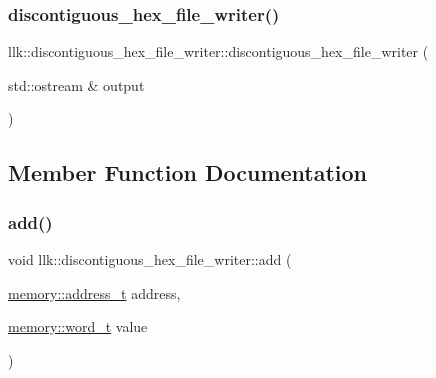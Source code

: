 \subsubsection{\texorpdfstring{discontiguous\+\_\+hex\+\_\+file\+\_\+writer()}{discontiguous\_hex\_file\_writer()}}
{\footnotesize\ttfamily llk\+::discontiguous\+\_\+hex\+\_\+file\+\_\+writer\+::discontiguous\+\_\+hex\+\_\+file\+\_\+writer (\begin{DoxyParamCaption}\item[{std\+::ostream \&}]{output }\end{DoxyParamCaption})\hspace{0.3cm}{\ttfamily [explicit]}}



\subsection{Member Function Documentation}
\mbox{\label{classllk_1_1discontiguous__hex__file__writer_a4dc35f2a9382c453d050d3e0ef8e1898}} 
\subsubsection{\texorpdfstring{add()}{add()}\hspace{0.1cm}{\footnotesize\ttfamily [1/2]}}
{\footnotesize\ttfamily void llk\+::discontiguous\+\_\+hex\+\_\+file\+\_\+writer\+::add (\begin{DoxyParamCaption}\item[{\hyperlink{classllk_1_1memory_ae7a4b897aa999f22e250dc8e4d773dec}{memory\+::address\+\_\+t}}]{address,  }\item[{\hyperlink{classllk_1_1memory_a432a6c0ae1bcb9c44d79cfa1a239419c}{memory\+::word\+\_\+t}}]{value }\end{DoxyParamCaption})}

\mbox{\label{classllk_1_1discontiguous__hex__file__writer_abadd72236ae15b74466c96f058290657}} 
